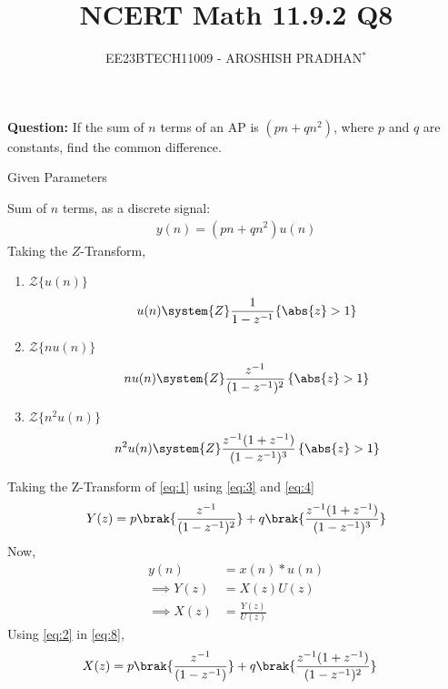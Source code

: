 \documentclass[journal,12pt,twocolumn]{IEEEtran}
\theoremstyle{remark}
\begin{document}

\vspace{3cm}

\title{NCERT Math 11.9.2 Q8}
\author{EE23BTECH11009 - AROSHISH PRADHAN$^{*}$%
}
\maketitle
\newpage
\bigskip
\textbf{Question:} If the sum of $n$ terms of an AP is $(pn + qn^2)$, where $p$ and $q$ are constants, find the common difference.

\solution
\fi
\begin{table}[!h]
    \centering
    
    \caption{Given Parameters}
    \label{tab:1}
\end{table}

Sum of $n$ terms, as a discrete signal:
\begin{align}
    y(n) = (pn + qn^2)u(n) \label{eq:1}
\end{align}
Taking the $Z$-Transform,
\begin{enumerate}
    \item $\mathcal{Z}\{u(n)\}$
\begin{align}
    u(n) \system{Z} \frac{1}{1-z^{-1}} \{\abs{z} > 1\} \label{eq:2}
\end{align}
    \item $\mathcal{Z}\{nu(n)\}$
\begin{align}
    nu(n) \system{Z} \frac{z^{-1}}{(1-z^{-1})^2}\, \{\abs{z} > 1\} \label{eq:3}
\end{align}
\item $\mathcal{Z}{\{n^2 u(n)\}}$
    \begin{align}
        n^2u(n) \system{Z} \frac{z^{-1}(1+z^{-1})}{(1-z^{-1})^3}\, \{\abs{z} > 1\} \label{eq:4}
    \end{align}
\end{enumerate}
Taking the Z-Transform of \eqref{eq:1} using \eqref{eq:3} and \eqref{eq:4}
\begin{align}
      Y(z) = p\brak{\frac{z^{-1}}{(1-z^{-1})^2}} + q\brak{\frac{z^{-1}(1 + z^{-1})}{(1-z^{-1})^3}}
\end{align}
Now, 
\begin{align}
    y(n) &= x(n) \ast u(n)\\
    \implies Y(z) &= X(z)U(z)\\
    \implies X(z) &= \frac{Y(z)}{U(z)}\label{eq:8}
\end{align}
Using \eqref{eq:2} in \eqref{eq:8},
\begin{align}
    X(z) &= p\brak{\frac{z^{-1}}{(1-z^{-1})}} + q\brak{\frac{z^{-1}(1 + z^{-1})}{(1-z^{-1})^2}}
\end{align}
\end{document}
